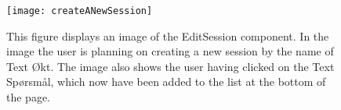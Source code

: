 \begin{figure}[H]
	\texttt{[image: createANewSession]}
	\caption{This figure displays an image of the EditSession component. In the image the user is planning on creating a new session by the name of Text Økt. The image also shows the user having clicked on the Text Spørsmål, which now have been added to the list at the bottom of the page.}
	\label{fig:editSessionComponent}
\end{figure}
